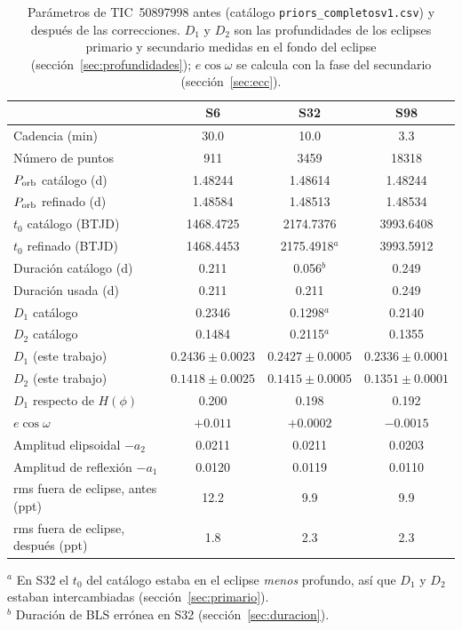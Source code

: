 \documentclass[11pt,a4paper]{article}
\newcommand{\porb}{P_{\rm orb}}
\begin{document}
\begin{table}[H]
\centering
\caption{Parámetros de TIC~50897998 antes (catálogo \texttt{priors\_completosv1.csv}) y después
de las correcciones. $D_1$ y $D_2$ son las profundidades de los eclipses primario y
secundario medidas en el fondo del eclipse (sección~\ref{sec:profundidades}); $e\cos\omega$ se
calcula con la fase del secundario (sección~\ref{sec:ecc}).}
\label{tab:resumen}
\begin{tabular}{lccc}
\toprule
 & S6 & S32 & S98 \\
\midrule
Cadencia (min) & 30.0 & 10.0 & 3.3 \\
Número de puntos & 911 & 3459 & 18318 \\
\midrule
$\porb$ catálogo (d) & 1.48244 & 1.48614 & 1.48244 \\
$\porb$ refinado (d) & 1.48584 & 1.48513 & 1.48534 \\
$t_0$ catálogo (BTJD) & 1468.4725 & 2174.7376 & 3993.6408 \\
$t_0$ refinado (BTJD) & 1468.4453 & 2175.4918$^{a}$ & 3993.5912 \\
Duración catálogo (d) & 0.211 & 0.056$^{b}$ & 0.249 \\
Duración usada (d) & 0.211 & 0.211 & 0.249 \\
\midrule
$D_1$ catálogo & 0.2346 & 0.1298$^{a}$ & 0.2140 \\
$D_2$ catálogo & 0.1484 & 0.2115$^{a}$ & 0.1355 \\
$D_1$ (este trabajo) & $0.2436\pm0.0023$ & $0.2427\pm0.0005$ & $0.2336\pm0.0001$ \\
$D_2$ (este trabajo) & $0.1418\pm0.0025$ & $0.1415\pm0.0005$ & $0.1351\pm0.0001$ \\
$D_1$ respecto de $H(\phi)$ & 0.200 & 0.198 & 0.192 \\
$e\cos\omega$ & $+0.011$ & $+0.0002$ & $-0.0015$ \\
\midrule
Amplitud elipsoidal $-a_2$ & 0.0211 & 0.0211 & 0.0203 \\
Amplitud de reflexión $-a_1$ & 0.0120 & 0.0119 & 0.0110 \\
rms fuera de eclipse, antes (ppt) & 12.2 & 9.9 & 9.9 \\
rms fuera de eclipse, después (ppt) & 1.8 & 2.3 & 2.3 \\
\bottomrule
\end{tabular}

\smallskip
\raggedright\footnotesize
$^{a}$ En S32 el $t_0$ del catálogo estaba en el eclipse \emph{menos} profundo, así que $D_1$ y
$D_2$ estaban intercambiadas (sección~\ref{sec:primario}).\\
$^{b}$ Duración de BLS errónea en S32 (sección~\ref{sec:duracion}).
\end{table}
\end{document}
